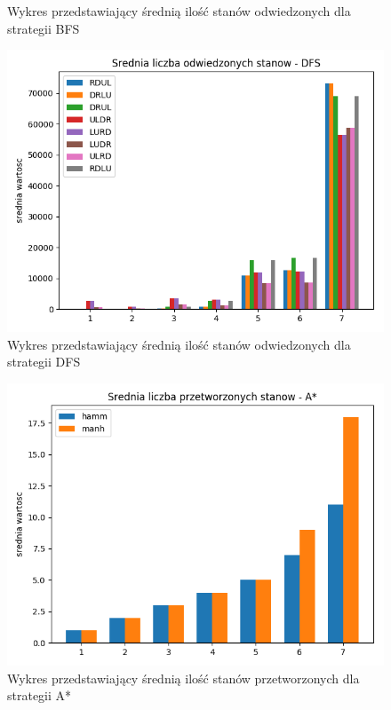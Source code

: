 \documentclass{classrep}
\begin{document}
{\begin{figure}
\caption{Wykres przedstawiający średnią ilość stanów odwiedzonych dla strategii BFS}
\end{figure}
\begin{figure}
\centering
\includegraphics [scale=0.5]{odwiedzone_DFS}
\caption{Wykres przedstawiający średnią ilość stanów odwiedzonych dla strategii DFS}
\end{figure}
\begin{figure}
\centering
\includegraphics [scale=0.5]{przetworzone_AStar}
\caption{Wykres przedstawiający średnią ilość stanów przetworzonych dla strategii A*}
\end{figure}
\begin{figure}
\centering

\end{figure}}
\end{document}

